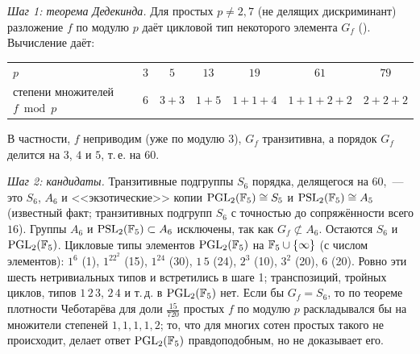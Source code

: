 \emph{Шаг 1: теорема Дедекинда.} Для простых $p\ne2,7$ (не делящих дискриминант) разложение $f$ по модулю $p$ даёт цикловой
тип некоторого элемента $G_f$ (). Вычисление даёт:
\begin{center}
\begin{tabular}{lcccccc}
\toprule
$p$ & $3$ & $5$ & $13$ & $19$ & $61$ & $79$\\
степени множителей $f\bmod p$ & $6$ & $3+3$ & $1+5$ & $1+1+4$ & $1+1+2+2$ & $2+2+2$\\
\bottomrule
\end{tabular}
\end{center}
В частности, $f$ неприводим (уже по модулю $3$), $G_f$ транзитивна, а порядок $G_f$ делится на $3$, $4$ и $5$, т.\,е. на $60$.

\emph{Шаг 2: кандидаты.} Транзитивные подгруппы $S_6$ порядка, делящегося на $60$,~--- это $S_6$, $A_6$ и <<экзотические>> копии
$\mathrm{PGL}_2(\mathbb F_5)\cong S_5$ и $\mathrm{PSL}_2(\mathbb F_5)\cong A_5$ (известный факт; транзитивных подгрупп $S_6$ с точностью до
сопряжённости всего $16$). Группы $A_6$ и $\mathrm{PSL}_2(\mathbb F_5)\subset A_6$ исключены, так как $G_f\not\subset A_6$. Остаются $S_6$ и
$\mathrm{PGL}_2(\mathbb F_5)$. Цикловые типы элементов $\mathrm{PGL}_2(\mathbb F_5)$ на $\mathbb F_5\cup\{\infty\}$ (с числом элементов):
$1^6$ (1), $1^22^2$ (15), $1^24$ (30), $1\,5$ (24), $2^3$ (10), $3^2$ (20), $6$ (20). Ровно эти шесть нетривиальных типов
и встретились в шаге 1; транспозиций, тройных циклов, типов $1\,2\,3$, $2\,4$ и т.\,д. в $\mathrm{PGL}_2(\mathbb F_5)$ нет. Если бы
$G_f=S_6$, то по теореме плотности Чеботарёва для доли $\frac{15}{720}$ простых $f$ по модулю $p$ раскладывался бы на
множители степеней $1,1,1,1,2$; то, что для многих сотен простых такого не происходит, делает ответ
$\mathrm{PGL}_2(\mathbb F_5)$ правдоподобным, но не доказывает его.

